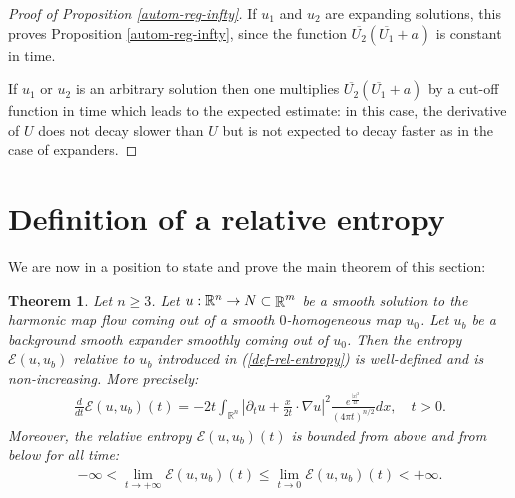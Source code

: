 \documentclass[a4paper,11pt,reqno]{amsart}
\newtheorem{theo}[defn]{Theorem}
\def\R{\mathop{\rm \mathbb{R}}\nolimits}
\begin{document}
\begin{proof}[Proof of Proposition \ref{autom-reg-infty}]
If $u_1$ and $u_2$ are expanding solutions, this proves Proposition \ref{autom-reg-infty}, since the function $\overline{U_2}(\overline{U_1}+a)$ is constant in time. 

If $u_1$ or $u_2$ is an arbitrary solution then one multiplies $\overline{U_2}(\overline{U_1}+a)$ by a cut-off function in time which leads to the expected estimate: in this case, the derivative of $U$ does not decay slower than $U$ but is not expected to decay faster as in the case of expanders.

\end{proof}

\section{Definition of a relative entropy}\label{section-rel-ent-Ilm-conj}
We are now in a position to state and prove the main theorem of this section:
\begin{theo}\label{mono-rel-ent}
Let $n\geq 3$. Let $u:\mathbb{R}^n\rightarrow N\subset\R^m$ be a smooth solution to the harmonic map flow coming out of a smooth $0$-homogeneous map $u_0$. Let $u_b$ be a background smooth expander smoothly coming out of $u_0$. Then the entropy $\mathcal{E}(u,u_b)$ relative to $u_b$ introduced in (\ref{def-rel-entropy}) is well-defined and is non-increasing. More precisely:
\begin{eqnarray}
\frac{d}{dt}\mathcal{E}(u,u_b)(t)=-2t\int_{\mathbb{R}^n}\left|\partial_tu+\frac{x}{2t}\cdot\nabla u\right|^2\frac{e^{\frac{|x|^2}{4t}}}{(4\pi t)^{n/2}}dx,\quad t>0.\label{evo-rel-entropy}
\end{eqnarray}
Moreover, the relative entropy $\mathcal{E}(u,u_b)(t)$ is bounded from above and from below for all time:
\begin{eqnarray*}
-\infty<\lim_{t\rightarrow+\infty}\mathcal{E}(u,u_b)(t)\leq \lim_{t\rightarrow 0}\mathcal{E}(u,u_b)(t)<+\infty.
\end{eqnarray*}

\end{theo}
\end{document}

